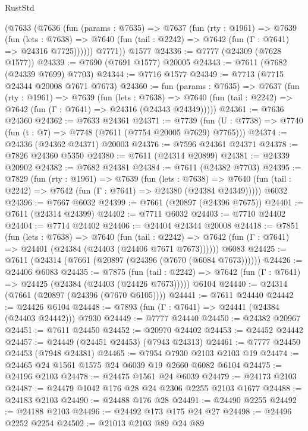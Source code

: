 \begin{lexlean}{RustStd}
\begin{coremodule}
      (@7633
        (@7636
          (fun (params : @7635) =>
          @7637
            (fun (rty : @1961) =>
            @7639
              (fun (lets : @7638) =>
              @7640 (fun (tail : @2242) => @7642 (fun (Γ : @7641) => @24316 @7725))))))
        @7771))
    @1577
@24336 := @7777 (@24309 (@7628 @1577))
@24339 := @7690 (@7691 @1577) @20005
@24343 := @7611 (@7682 (@24339 @7699) @7703)
@24344 := @7716 @1577
@24349 := @7713 (@7715 @24344 @20008 @7671 @7673)
@24360 := fun (params : @7635) =>
  @7637
    (fun (rty : @1961) =>
    @7639
      (fun (lets : @7638) =>
      @7640 (fun (tail : @2242) => @7642 (fun (Γ : @7641) => @24316 (@24343 @24349)))))
@24361 := @7636 @24360
@24362 := @7633 @24361
@24371 := @7739
    (fun (U : @7738) => @7740 (fun (t : @7) => @7748 (@7611 (@7754 @20005 @7629) @7765)))
@24374 := @24336 (@24362 @24371) @20003
@24376 := @7596 @24361 @24371
@24378 := @7826 @24360 @5350
@24380 := @7611 (@24314 @20899)
@24381 := @24339 @20902
@24382 := @7682 @24381
@24384 := @7611 (@24382 @7703)
@24395 := @7829
    (fun (rty : @1961) =>
    @7639
      (fun (lets : @7638) =>
      @7640 (fun (tail : @2242) => @7642 (fun (Γ : @7641) => @24380 (@24384 @24349)))))
    @6032
@24396 := @7667 @6032
@24399 := @7661 (@20897 (@24396 @7675))
@24401 := @7611 (@24314 @24399)
@24402 := @7711 @6032
@24403 := @7710 @24402
@24404 := @7714 @24402
@24406 := @24404 @24344 @20008
@24418 := @7851
    (fun (lets : @7638) =>
    @7640
      (fun (tail : @2242) =>
      @7642 (fun (Γ : @7641) => @24401 (@24384 (@24403 (@24406 @7671 @7673))))))
    @6083
@24425 := @7611 (@24314 (@7661 (@20897 (@24396 (@7670 (@6084 @7673))))))
@24426 := @24406 @6083
@24435 := @7875
    (fun (tail : @2242) => @7642 (fun (Γ : @7641) => @24425 (@24384 (@24403 (@24426 @7673)))))
    @6104
@24440 := @24314 (@7661 (@20897 (@24396 (@7670 @6105))))
@24441 := @7611 @24440
@24442 := @24426 @6104
@24448 := @7893 (fun (Γ : @7641) => @24441 (@24384 (@24403 @24442))) @7930
@24449 := @7777 @24440
@24450 := @24382 @20967
@24451 := @7611 @24450
@24452 := @20970 @24402
@24453 := @24452 @24442
@24457 := @24449 (@24451 @24453) (@7943 @24313)
@24461 := @7777 @24450 @24453 (@7948 @24381)
@24465 := @7954 @7930 @2103 @2103 @19
@24474 := @24465 @24 @1561 @1575 @24 @6039 @19 @2660 @6082 @6104
@24475 := @24196 @2103
@24478 := @24475 @1561 @24 @6039
@24479 := @24173 @2103
@24487 := @24479 @1042 @176 @28 @24 @2306 @2255 @2103 @1677
@24488 := @24183 @2103
@24490 := @24488 @176 @28
@24491 := @24490 @2255
@24492 := @24188 @2103
@24496 := @24492 @173 @175 @24 @27
@24498 := @24496 @2252 @2254
@24502 := @21013 @2103 @89 @24 @89

\end{coremodule}
\end{lexlean}
